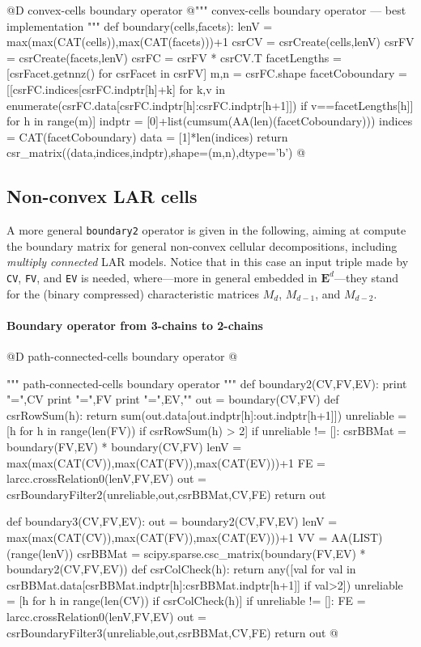 \documentclass[11pt,oneside]{article}	%
\begin{document}
@D convex-cells boundary operator
@{""" convex-cells boundary operator --- best implementation """
def boundary(cells,facets):
    lenV = max(max(CAT(cells)),max(CAT(facets)))+1
    csrCV = csrCreate(cells,lenV)
    csrFV = csrCreate(facets,lenV)
    csrFC = csrFV * csrCV.T
    facetLengths = [csrFacet.getnnz() for csrFacet in csrFV]
    m,n = csrFC.shape
    facetCoboundary = [[csrFC.indices[csrFC.indptr[h]+k] 
        for k,v in enumerate(csrFC.data[csrFC.indptr[h]:csrFC.indptr[h+1]]) 
            if v==facetLengths[h]] for h in range(m)]
    indptr = [0]+list(cumsum(AA(len)(facetCoboundary)))
    indices = CAT(facetCoboundary)
    data = [1]*len(indices)
    return csr_matrix((data,indices,indptr),shape=(m,n),dtype='b')
@}


\subsection{Non-convex LAR cells}

A more general \texttt{boundary2} operator is given in the following, aiming at compute the boundary matrix for general non-convex cellular decompositions, including \emph{multiply connected} LAR models.
Notice that in this case an input triple made by \texttt{CV}, \texttt{FV}, and \texttt{EV} is needed,
where---more in general embedded in $\mathbf{E}^d$---they stand for the (binary compressed) characteristic matrices $M_d$, $M_{d-1}$, and $M_{d-2}$.

\paragraph{Boundary operator from 3-chains to 2-chains}

@D path-connected-cells boundary operator
@{""" path-connected-cells boundary operator """
def boundary2(CV,FV,EV):
    print "\nCV =",CV
    print "\nFV =",FV
    print "\nEV =",EV,"\n"
    out = boundary(CV,FV)
    def csrRowSum(h): 
        return sum(out.data[out.indptr[h]:out.indptr[h+1]])    
    unreliable = [h for h in range(len(FV)) if csrRowSum(h) > 2]
    if unreliable != []:
        csrBBMat = boundary(FV,EV) * boundary(CV,FV)
        lenV = max(max(CAT(CV)),max(CAT(FV)),max(CAT(EV)))+1
        FE = larcc.crossRelation0(lenV,FV,EV)
        out = csrBoundaryFilter2(unreliable,out,csrBBMat,CV,FE)
    return out

def boundary3(CV,FV,EV):
    out = boundary2(CV,FV,EV)
    lenV = max(max(CAT(CV)),max(CAT(FV)),max(CAT(EV)))+1
    VV = AA(LIST)(range(lenV))
    csrBBMat = scipy.sparse.csc_matrix(boundary(FV,EV) * boundary2(CV,FV,EV))
    def csrColCheck(h): 
        return any([val for val in csrBBMat.data[csrBBMat.indptr[h]:csrBBMat.indptr[h+1]] if val>2])    
    unreliable = [h for h in range(len(CV)) if csrColCheck(h)]
    if unreliable != []:
        FE = larcc.crossRelation0(lenV,FV,EV)
        out = csrBoundaryFilter3(unreliable,out,csrBBMat,CV,FE)
    return out
@}
\end{document}
